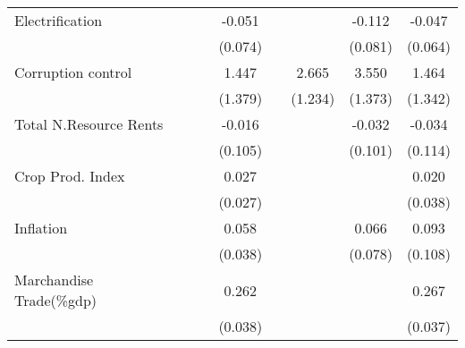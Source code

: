 \begin{table}[H]
\begin{adjustbox}{max width=\textwidth}
\begin{tabular}{l*{7}{c}}
\addlinespace
Electrification&                     &                     &      -0.051         &                     &                     &      -0.112         &      -0.047         \\
            &                     &                     &     (0.074)         &                     &                     &     (0.081)         &     (0.064)         \\
\addlinespace
Corruption control&                     &                     &       1.447         &                     &       2.665\sym{**} &       3.550\sym{***}&       1.464         \\
            &                     &                     &     (1.379)         &                     &     (1.234)         &     (1.373)         &     (1.342)         \\
\addlinespace
Total N.Resource Rents&                     &                     &      -0.016         &                     &                     &      -0.032         &      -0.034         \\
            &                     &                     &     (0.105)         &                     &                     &     (0.101)         &     (0.114)         \\
\addlinespace
Crop Prod. Index&                     &                     &       0.027         &                     &                     &                     &       0.020         \\
            &                     &                     &     (0.027)         &                     &                     &                     &     (0.038)         \\
\addlinespace
Inflation   &                     &                     &       0.058         &                     &                     &       0.066         &       0.093         \\
            &                     &                     &     (0.038)         &                     &                     &     (0.078)         &     (0.108)         \\
\addlinespace
Marchandise Trade(\%gdp)&                     &                     &       0.262\sym{***}&                     &                     &                     &       0.267\sym{***}\\
            &                     &                     &     (0.038)         &                     &                     &                     &     (0.037)         \\

\end{tabular}
\end{adjustbox}
\end{table}
